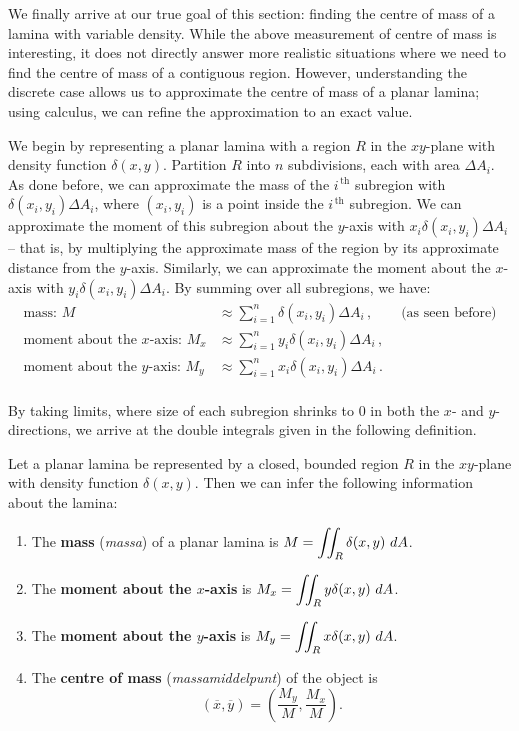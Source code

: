 We finally arrive at our true goal of this section: finding the centre of mass of a lamina with variable density. While the above measurement of centre of mass is interesting, it does not directly answer more realistic situations where we need to find the centre of mass of a contiguous region. However, understanding the discrete case allows us to approximate the centre of mass of a planar lamina; using calculus, we can refine the approximation to an exact value.

We begin by representing a planar lamina with a region $R$ in the $xy$-plane with density function $\delta(x,y)$. Partition $R$ into $n$ subdivisions, each with area $\Delta A_i$. As done before, we can approximate the mass of the $i^{\,\text{th}}$ subregion with $\delta(x_i,y_i)\Delta A_i$, where $(x_i,y_i)$ is a point inside the $i^{\,\text{th}}$ subregion. We can approximate the moment of this subregion about the $y$-axis with $x_i\delta(x_i,y_i)\Delta A_i$ -- that is, by multiplying the approximate mass of the region by its approximate distance from the $y$-axis. Similarly, we can approximate the moment about the $x$-axis with $y_i\delta(x_i,y_i)\Delta A_i$. By summing over all subregions, we have:
\begin{align*}
\text{mass: } M &\approx \sum_{i=1}^n \delta(x_i,y_i)\Delta A_i\,, \qquad \text{(as seen before)}\\
\text{moment about the $x$-axis: } M_x &\approx \sum_{i=1}^n y_i\delta(x_i,y_i)\Delta A_i\,,\\
\text{moment about the $y$-axis: } M_y &\approx \sum_{i=1}^n x_i\delta(x_i,y_i)\Delta A_i\,.\\
\end{align*}

By taking limits, where size of each subregion shrinks to 0 in both the $x$- and $y$- directions, we arrive at the double integrals given in the following definition.

\begin{definition}\label{thm:center_of_mass}
Let a planar lamina be represented by a closed, bounded region $R$ in the $xy$-plane with density function $\delta(x,y)$. Then we can infer the following information about the lamina: 
\begin{enumerate}
	\item The \textbf{mass} (\textit{massa}) of a planar lamina is $\ds M = \iint_R\delta(x,y)\ dA$.
	\item The \textbf{moment about the $x$-axis} is $\ds  M_x = \iint_Ry\delta(x,y)\ dA$.
	\item The \textbf{moment about the $y$-axis} is $\ds  M_y = \iint_Rx\delta(x,y)\ dA$.
	\item The \textbf{centre of mass} (\textit{massamiddelpunt}) of the object is
	$$(\overline{x},\overline{y}) = \left(\frac{M_y}{M},\frac{M_x}M\right).$$
\end{enumerate}
\end{definition}

